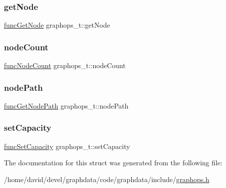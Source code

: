 \subsubsection{\texorpdfstring{get\+Node}{getNode}}
{\footnotesize\ttfamily \hyperlink{graphops_8h_ab5b794bee2b91f62033011c8e4c867ec}{func\+Get\+Node} graphops\+\_\+t\+::get\+Node}

\mbox{\label{structgraphops__t_a07801b43de87d48f426d7abf7959e738}} 
\subsubsection{\texorpdfstring{node\+Count}{nodeCount}}
{\footnotesize\ttfamily \hyperlink{graphops_8h_a5f1ba03cba8efec39224db7b6afc8374}{func\+Node\+Count} graphops\+\_\+t\+::node\+Count}

\mbox{\label{structgraphops__t_afd2a0b194e922fa656b4352a8fed9e05}} 
\subsubsection{\texorpdfstring{node\+Path}{nodePath}}
{\footnotesize\ttfamily \hyperlink{graphops_8h_a43aa084c4514d1f3c2179551905aa655}{func\+Get\+Node\+Path} graphops\+\_\+t\+::node\+Path}

\mbox{\label{structgraphops__t_a6f05f8daf75bc380988e20e019681c0a}} 
\subsubsection{\texorpdfstring{set\+Capacity}{setCapacity}}
{\footnotesize\ttfamily \hyperlink{graphops_8h_a7f161b975929757de2684535b39d60bb}{func\+Set\+Capacity} graphops\+\_\+t\+::set\+Capacity}



The documentation for this struct was generated from the following file\+:\begin{DoxyCompactItemize}
\item 
/home/david/devel/graphdata/code/graphdata/include/\hyperlink{graphops_8h}{graphops.\+h}\end{DoxyCompactItemize}
